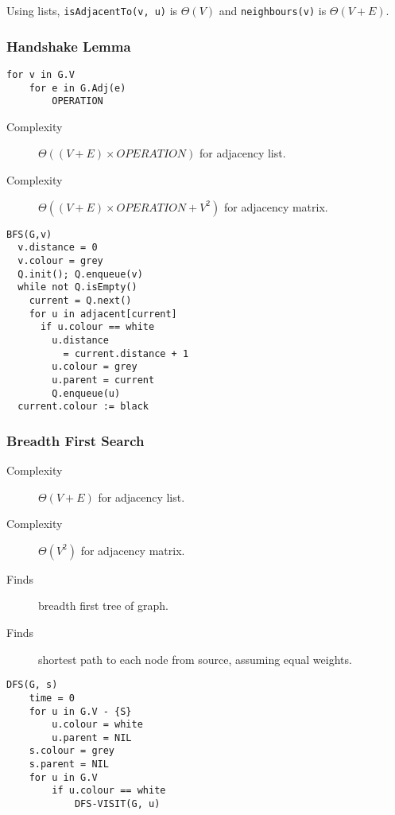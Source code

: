 \documentclass[10pt, a4paper,landscape]{article}
\begin{document}
\begin{multicols*}{4}
Using lists, \texttt{isAdjacentTo(v, u)} is $\Theta(V)$ and \texttt{neighbours(v)} is $\Theta(V + E)$.

\subsubsection{Handshake Lemma}
\begin{lstlisting}
for v in G.V
    for e in G.Adj(e)
        OPERATION
\end{lstlisting}
\begin{description}
    \item[Complexity] $\Theta((V+E) \times OPERATION)$ for adjacency list.
    \item[Complexity] $\Theta((V+E) \times OPERATION + V^2)$ for adjacency matrix.
\end{description}

\begin{lstlisting}
BFS(G,v)
  v.distance = 0 
  v.colour = grey 
  Q.init(); Q.enqueue(v)
  while not Q.isEmpty()
    current = Q.next()
    for u in adjacent[current]
      if u.colour == white
        u.distance 
          = current.distance + 1 
        u.colour = grey 
        u.parent = current 
        Q.enqueue(u)
  current.colour := black
\end{lstlisting}

\subsubsection{Breadth First Search}
\begin{description}
    \item[Complexity] $\Theta(V+E)$ for adjacency list.
    \item[Complexity] $\Theta(V^2)$ for adjacency matrix.
    \item[Finds] breadth first tree of graph.
    \item[Finds] shortest path to each node from source, assuming equal weights.
\end{description}

\begin{lstlisting}
DFS(G, s)
    time = 0
    for u in G.V - {S}
        u.colour = white
        u.parent = NIL
    s.colour = grey
    s.parent = NIL
    for u in G.V
        if u.colour == white
            DFS-VISIT(G, u)


\end{lstlisting}
\end{multicols*}
\end{document}

